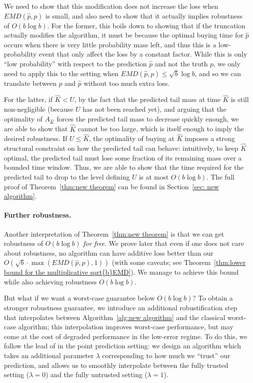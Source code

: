 We need to show that this modification does not increase the loss when $EMD(\hat p, p)$ is small, and also need to show that it actually implies robustness of $O(b \log b)$.  For the former, this boils down to showing that if the truncation actually modifies the algorithm, it must be because the optimal buying time for $\hat p$ occurs when there is very little probability mass left, and thus this is a low-probability event that only affect the loss by a constant factor.  While this is only ``low probability'' with respect to the prediction $\hat p$ and not the truth $p$, we only need to apply this to the setting when $EMD(\hat p, p) \leq \sqrt{b} \log b$, and so we can translate between $p$ and $\hat p$ without too much extra loss.  

For the latter, if $\hat K<U$, by the fact that the predicted tail mass at time $\hat K$ is still non-negligible (because $U$ has not been reached yet), and arguing that the optimality of $A_{\hat{K}}$ forces the predicted tail mass to decrease quickly enough, we are able to show that $\hat K$ cannot be too large, which is itself enough to imply the desired robustness. If $U \leq \hat K$, the optimality of buying at $\hat K$ imposes a strong structural constraint on how the predicted tail can behave: intuitively, to keep $\hat K$ optimal, the predicted tail must lose some fraction of its remaining mass over a bounded time window. Thus, we are able to show that the time required for the predicted tail to drop to the level defining $U$ is at most $O(b\log b)$. The full proof of Theorem~\ref{thm:new theorem} can be found in Section~\ref{sec: new algorithm}.


\paragraph{Further robustness.}
Another interpretation of Theorem~\ref{thm:new theorem} is that we can get robustness of $O(b \log b)$ \emph{for free}.  We prove later that even if one does not care about robustness, no algorithm can have additive loss better than our $O\left( \sqrt{b} \cdot \max\left(EMD(\hat p, p), 1\right) \right)$ (with some caveats; see Theorem~\ref{thm:lower bound for the multiplicative sqrt{b}EMD}).  We manage to achieve this bound while also achieving robustness $O(b \log b)$.

But what if we want a worst-case guarantee below $O(b \log b)$? To obtain a stronger robustness guarantee, we introduce an additional robustification step that interpolates between Algorithm~\ref{alg:new algorithm} and the classical worst-case algorithm; this interpolation improves worst-case performance, but may come at the cost of degraded performance in the low-error regime. To do this, we follow the lead of \citet{kumar2024improvingonlinealgorithmsml} in the point prediction setting: we design an algorithm which takes an additional parameter $\lambda$ corresponding to how much we ``trust'' our prediction, and allows us to smoothly interpolate between the fully trusted setting ($\lambda = 0$) and the fully untrusted setting ($\lambda = 1$).  


